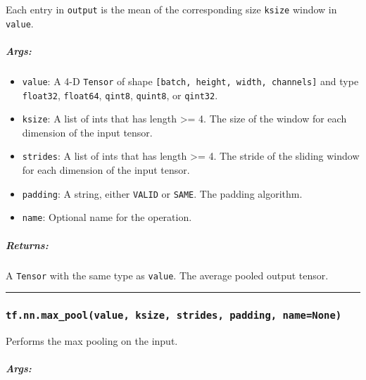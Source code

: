 Each entry in \texttt{output} is the mean of the corresponding size
\texttt{ksize} window in \texttt{value}.

\subparagraph{Args: }\label{args-10}

\begin{itemize}
\tightlist
\item
  \texttt{value}: A 4-D \texttt{Tensor} of shape
  \texttt{{[}batch,\ height,\ width,\ channels{]}} and type
  \texttt{float32}, \texttt{float64}, \texttt{qint8}, \texttt{quint8},
  or \texttt{qint32}.
\item
  \texttt{ksize}: A list of ints that has length \textgreater{}= 4. The
  size of the window for each dimension of the input tensor.
\item
  \texttt{strides}: A list of ints that has length \textgreater{}= 4.
  The stride of the sliding window for each dimension of the input
  tensor.
\item
  \texttt{padding}: A string, either
  \texttt{\textquotesingle{}VALID\textquotesingle{}} or
  \texttt{\textquotesingle{}SAME\textquotesingle{}}. The padding
  algorithm.
\item
  \texttt{name}: Optional name for the operation.
\end{itemize}

\subparagraph{Returns: }\label{returns-10}

A \texttt{Tensor} with the same type as \texttt{value}. The average
pooled output tensor.

\begin{center}\rule{0.5\linewidth}{\linethickness}\end{center}

\subsubsection{\texorpdfstring{\texttt{tf.nn.max\_pool(value,\ ksize,\ strides,\ padding,\ name=None)}
}{tf.nn.max\_pool(value, ksize, strides, padding, name=None) }}\label{tf.nn.maxux5fpoolvalue-ksize-strides-padding-namenone}

Performs the max pooling on the input.

\subparagraph{Args: }\label{args-11}


